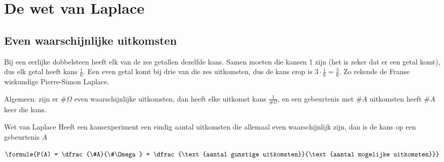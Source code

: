 
\begin{oefeningen}
\end{oefeningen}

\section{De wet van Laplace}

\subsection{Even waarschijnlijke uitkomsten}

Bij een eerlijke dobbelsteen heeft elk van de zes getallen dezelfde kans. Samen moeten die kansen 1 zijn (het is zeker dat er een getal komt), dus elk getal heeft kans $\frac16$. Een even getal komt bij drie van die zes uitkomsten, dus de kans erop is $3 \cdot \frac16 = \frac36$. Zo rekende de Franse wiskundige Pierre-Simon Laplace.

Algemeen: zijn er $\#\Omega$ even waarschijnlijke uitkomsten, dan heeft elke uitkomst kans $\frac{1}{\#\Omega}$, en een gebeurtenis met $\#A$ uitkomsten heeft $\#A$ keer die kans.

\begin{theorie}
\begin{stelling}{Wet van Laplace}
Heeft een kansexperiment een eindig aantal uitkomsten die allemaal even waarschijnlijk zijn, dan is de kans op een gebeurtenis $A$

\vspace{1mm}
\qquad $\formule{P(A) = \dfrac{\#A}{\#\Omega} = \dfrac{\text{aantal gunstige uitkomsten}}{\text{aantal mogelijke uitkomsten}}}$
\end{stelling}
\end{theorie}

